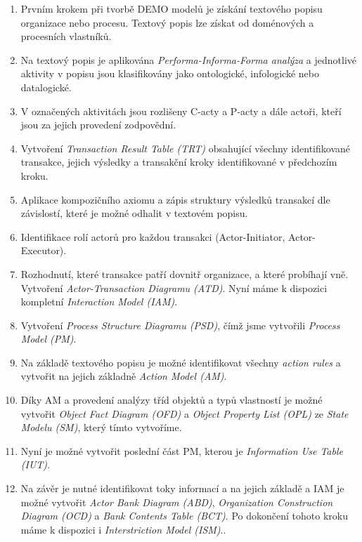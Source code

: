 \begin{enumerate}
\item Prvním krokem při tvorbě DEMO modelů je získání textového popisu organizace nebo procesu. Textový popis lze získat od doménových a procesních vlastníků.
\item Na textový popis je aplikována \textit{Performa-Informa-Forma analýza} a jednotlivé aktivity v popisu jsou klasifikovány jako ontologické, infologické nebo datalogické.
\item V označených aktivitách jsou rozlišeny C-acty a P-acty a dále actoři, kteří jsou za jejich provedení zodpovědní.
\item Vytvoření \textit{Transaction Result Table (TRT)} obsahující všechny identifikované transakce, jejich výsledky a transakční kroky identifikované v předchozím kroku.
\item Aplikace kompozičního axiomu a zápis struktury výsledků transakcí dle závislostí, které je možné odhalit v textovém popisu.
\item Identifikace rolí actorů pro každou transakci (Actor-Initiator, Actor-Executor).
\item Rozhodnutí, které transakce patří dovnitř organizace, a které probíhají vně. Vytvoření \textit{Actor-Transaction Diagramu (ATD)}. Nyní máme k dispozici kompletní \textit{Interaction Model (IAM)}.
\item Vytvoření \textit{Process Structure Diagramu (PSD)}, čímž jsme vytvořili \textit{Process Model (PM)}.
\item Na základě textového popisu je možné identifikovat všechny \textit{action rules} a vytvořit na jejich základně \textit{Action Model (AM)}.
\item Díky AM a provedení analýzy tříd objektů a typů vlastností je možné vytvořit \textit{Object Fact Diagram (OFD)} a \textit{Object Property List (OPL)} ze \textit{State Modelu (SM)}, který tímto vytvoříme.
\item Nyní je možné vytvořit poslední část PM, kterou je \textit{Information Use Table (IUT)}.
\item Na závěr je nutné identifikovat toky informací a na jejich základě a IAM je možné vytvořit \textit{Actor Bank Diagram (ABD)}, \textit{Organization Construction Diagram (OCD)} a \textit{Bank Contents Table (BCT)}. Po dokončení tohoto kroku máme k dispozici i \textit{Interstriction Model (ISM)}..
\end{enumerate}